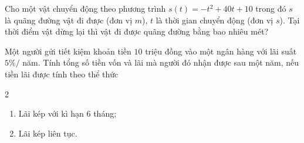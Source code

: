 \begin{bt}%
	Cho một vật chuyển động theo phương trình $s(t)=-t^2+40t+10$ trong đó $s$ là quãng đường vật đi được (đơn vị $m$), $t$ là thời gian chuyển động (đơn vị $s$). Tại thời điểm vật dừng lại thì vật đi được quãng đường bằng bao nhiêu mét?
\end{bt}

\begin{bt}%

	Một người gửi tiết kiệm khoản tiền $10$ triệu đồng vào một ngân hàng với lãi suất $5 \% /$ năm. Tính tổng số tiền vốn và lãi mà người đó nhận được sau một năm, nếu tiền lãi được tính theo thể thức
	\begin{multicols}{2}
		\begin{enumerate}
			\item Lãi kép với kì hạn $6$ tháng;
			\item Lãi kép liên tục.
		\end{enumerate}
	\end{multicols}	
\end{bt}

